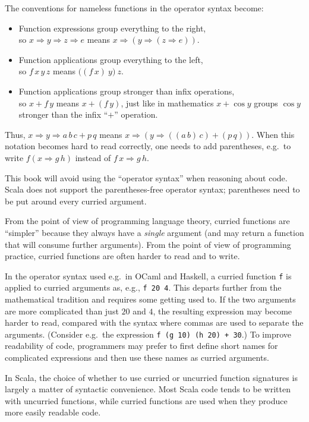 The conventions for nameless functions in the operator syntax become:
\begin{itemize}
\item Function expressions group everything to the right,\\
so $x\Rightarrow y\Rightarrow z\Rightarrow e$ means $x\Rightarrow\left(y\Rightarrow\left(z\Rightarrow e\right)\right)$.
\item Function applications group everything to the left,\\
so $f\,x\,y\,z$ means $\big((f\,x)\:y\big)\:z$.
\item Function applications group stronger than infix operations,\\
so $x+f\,y$ means $x+(f\,y)$, just like in mathematics $x+\cos y$
groups $\cos y$ stronger than the infix ``$+$'' operation.
\end{itemize}
Thus, $x\Rightarrow y\Rightarrow a\,b\,c+p\,q$ means $x\Rightarrow\left(y\Rightarrow\left(\left(a\,b\right)\,c\right)+(p\,q)\right)$.
When this notation becomes hard to read correctly, one needs to add
parentheses, e.g.\ to write $f(x\Rightarrow g\,h)$ instead of $f\,x\Rightarrow g\,h$.

This book will avoid using the ``operator syntax'' when reasoning
about code. Scala does not support the parentheses-free operator syntax;
parentheses need to be put around every curried argument.

From the point of view of programming language theory, curried functions
are ``simpler'' because they always have a \emph{single} argument
(and may return a function that will consume further arguments). From
the point of view of programming practice, curried functions are often
harder to read and to write.

In the operator syntax used e.g.\ in OCaml and Haskell, a curried
function \lstinline!f! is applied to curried arguments as, e.g.,
\lstinline!f 20 4!. This departs further from the mathematical tradition
and requires some getting used to. If the two arguments are more complicated
than just $20$ and $4$, the resulting expression may become harder
to read, compared with the syntax where commas are used to separate
the arguments. (Consider e.g.~the expression \lstinline!f (g 10) (h 20) + 30!.)
To improve readability of code, programmers may prefer to first define
short names for complicated expressions and then use these names as
curried arguments.

In Scala, the choice of whether to use curried or uncurried function
signatures is largely a matter of syntactic convenience. Most Scala
code tends to be written with uncurried functions, while curried functions
are used when they produce more easily readable code.

